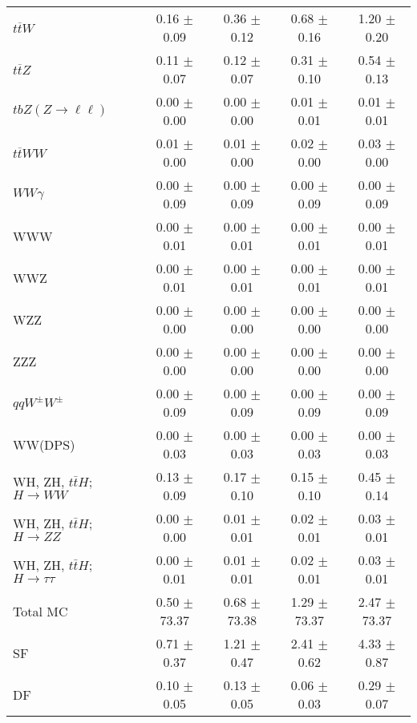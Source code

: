 \begin{tabular}{l|cccc}
                   $t\overline{t}W$ &  0.16 $\pm$  0.09 &  0.36 $\pm$  0.12 &  0.68 $\pm$  0.16 &  1.20 $\pm$  0.20 \\
                   $t\overline{t}Z$ &  0.11 $\pm$  0.07 &  0.12 $\pm$  0.07 &  0.31 $\pm$  0.10 &  0.54 $\pm$  0.13 \\
    $tbZ (Z \rightarrow \ell \ell)$ &  0.00 $\pm$  0.00 &  0.00 $\pm$  0.00 &  0.01 $\pm$  0.01 &  0.01 $\pm$  0.01 \\
                  $t\overline{t}WW$ &  0.01 $\pm$  0.00 &  0.01 $\pm$  0.00 &  0.02 $\pm$  0.00 &  0.03 $\pm$  0.00 \\
                         $WW\gamma$ &  0.00 $\pm$  0.09 &  0.00 $\pm$  0.09 &  0.00 $\pm$  0.09 &  0.00 $\pm$  0.09 \\
                                WWW &  0.00 $\pm$  0.01 &  0.00 $\pm$  0.01 &  0.00 $\pm$  0.01 &  0.00 $\pm$  0.01 \\
                                WWZ &  0.00 $\pm$  0.01 &  0.00 $\pm$  0.01 &  0.00 $\pm$  0.01 &  0.00 $\pm$  0.01 \\
                                WZZ &  0.00 $\pm$  0.00 &  0.00 $\pm$  0.00 &  0.00 $\pm$  0.00 &  0.00 $\pm$  0.00 \\
                                ZZZ &  0.00 $\pm$  0.00 &  0.00 $\pm$  0.00 &  0.00 $\pm$  0.00 &  0.00 $\pm$  0.00 \\
                 $qqW^{\pm}W^{\pm}$ &  0.00 $\pm$  0.09 &  0.00 $\pm$  0.09 &  0.00 $\pm$  0.09 &  0.00 $\pm$  0.09 \\
                            WW(DPS) &  0.00 $\pm$  0.03 &  0.00 $\pm$  0.03 &  0.00 $\pm$  0.03 &  0.00 $\pm$  0.03 \\
WH, ZH, $t\bar{t}H$; $H \rightarrow WW$ &  0.13 $\pm$  0.09 &  0.17 $\pm$  0.10 &  0.15 $\pm$  0.10 &  0.45 $\pm$  0.14 \\
WH, ZH, $t\bar{t}H$; $H \rightarrow ZZ$ &  0.00 $\pm$  0.00 &  0.01 $\pm$  0.01 &  0.02 $\pm$  0.01 &  0.03 $\pm$  0.01 \\
WH, ZH, $t\bar{t}H$; $H \rightarrow \tau\tau$ &  0.00 $\pm$  0.01 &  0.01 $\pm$  0.01 &  0.02 $\pm$  0.01 &  0.03 $\pm$  0.01 \\
\hline\hline
                           Total MC &  0.50 $\pm$ 73.37 &  0.68 $\pm$ 73.38 &  1.29 $\pm$ 73.37 &  2.47 $\pm$ 73.37 \\
\hline
                                 SF &  0.71 $\pm$  0.37 &  1.21 $\pm$  0.47 &  2.41 $\pm$  0.62 &  4.33 $\pm$  0.87 \\
                                 DF &  0.10 $\pm$  0.05 &  0.13 $\pm$  0.05 &  0.06 $\pm$  0.03 &  0.29 $\pm$  0.07 \\

\end{tabular}
